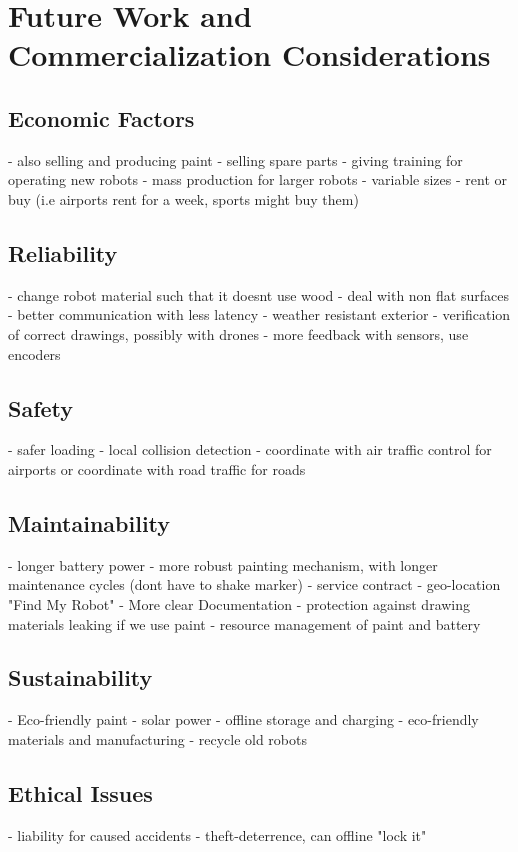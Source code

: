 \section{Future Work and Commercialization Considerations}
\label{sec:future_work}

\subsection{Economic Factors}
- also selling and producing paint
- selling spare parts
- giving training for operating new robots
- mass production for larger robots
- variable sizes
- rent or buy (i.e airports rent for a week, sports might buy them)

\subsection{Reliability}
- change robot material such that it doesnt use wood
- deal with non flat surfaces
- better communication with less latency
- weather resistant exterior
- verification of correct drawings, possibly with drones
- more feedback with sensors, use encoders

\subsection{Safety}
- safer loading
- local collision detection
- coordinate with air traffic control for airports or coordinate with road traffic for roads

\subsection{Maintainability}
- longer battery power
- more robust painting mechanism, with longer maintenance cycles (dont have to shake marker)
- service contract
- geo-location "Find My Robot"
- More clear Documentation
- protection against drawing materials leaking if we use paint
- resource management of paint and battery

\subsection{Sustainability}
- Eco-friendly paint
- solar power
- offline storage and charging
- eco-friendly materials and manufacturing
- recycle old robots

\subsection{Ethical Issues}
- liability for caused accidents
- theft-deterrence, can offline "lock it"

